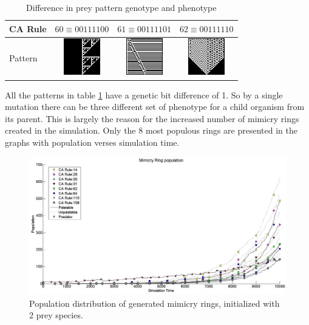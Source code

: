 \documentclass[letterpaper]{article}
\numberwithin{equation}{section}
\begin{document}
\begin{table}[H]
\centering
\begin{tabular}{|l|c|c|c|}
  \hline
  CA Rule & \(60 \equiv 00111100\) & \(61 \equiv 00111101\) & \(62 \equiv 00111110 \) \\ \hline
  Pattern & \parbox[c]{2.1em}{\includegraphics[scale=0.50]{../tex/images/CARule60}} 
  				& \parbox[c]{2.1em}{\includegraphics[scale=0.50]{../tex/images/CARule61}} 
  				& \parbox[c]{2.1em}{\includegraphics[scale=0.50]{../tex/images/CARule62}}\\
  \hline
\end{tabular}
\caption{Difference in prey pattern genotype and phenotype}
\label{tab:diff-in-pattern}
\end{table}

All the patterns in table \ref{tab:diff-in-pattern} have a genetic bit difference of 1. So by a single mutation there can be three different set of phenotype for a child organism from its parent. This is largely the reason for the increased number of mimicry rings created in the simulation. Only the 8 most populous rings are presented in the graphs with population verses simulation time.

\begin{figure}[H]
	\centering
	\includegraphics[scale=0.40]{../tex/images/simTime10k-2Prey-generated-prey}
	\caption[Population distribution of generated mimicry rings (2 prey species)]{Population distribution of generated mimicry rings, initialized with 2 prey species.}
	\label{fig:plot-2-prey-generated-prey}
\end{figure}
\end{document}

